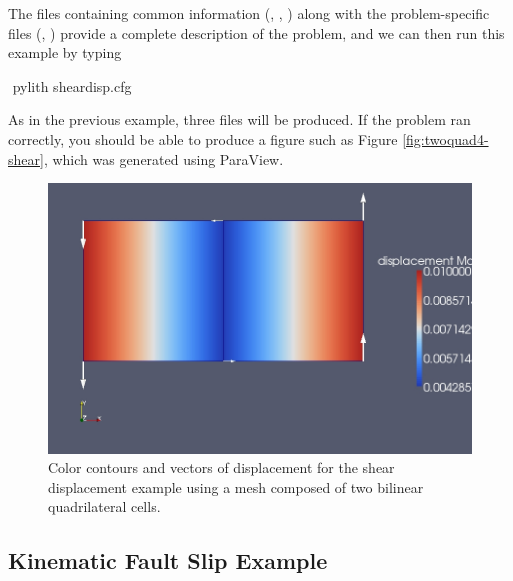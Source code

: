 The files containing common information (,
, ) along with
the problem-specific files (,
) provide a complete description of the
problem, and we can then run this example by typing
\begin{shell}
$$ pylith sheardisp.cfg
\end{shell}
As in the previous example, three files will be produced. If the
problem ran correctly, you should be able to produce a figure such as
Figure \vref{fig:twoquad4-shear}, which was generated using ParaView.

\begin{figure}
  \includegraphics[scale=0.33]{examples/figs/twoquad4-sheardisp}
  \caption{Color contours and vectors of displacement for the shear
    displacement example using a mesh composed of two bilinear
    quadrilateral cells.}
  \label{fig:twoquad4-shear}
\end{figure}


\subsection{Kinematic Fault Slip Example}

